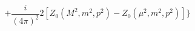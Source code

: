 \begin{equation}
+\frac{i}{(4\pi )^{2}}2[Z_{0}(M^{2},m^{2},p^{2})-Z_{0}(\mu
^{2},m^{2},p^{2})]\}
\end{equation}

